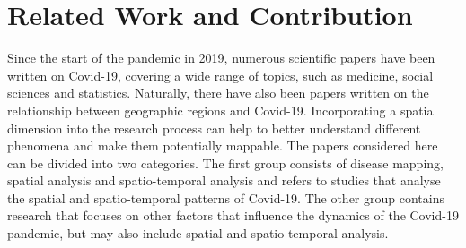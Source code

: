 \section{Related Work and Contribution}
Since the start of the pandemic in 2019, numerous scientific papers have been written on Covid-19, covering a wide range of topics, such as medicine, social sciences and statistics. Naturally, there have also been papers written on the relationship between geographic regions and Covid-19. Incorporating a spatial dimension into the research process can help to better understand different phenomena and make them potentially mappable. The papers considered here can be divided into two categories. The first group consists of disease mapping, spatial analysis and spatio-temporal analysis and refers to studies that analyse the spatial and spatio-temporal patterns of Covid-19. The other group contains research that focuses on other factors that influence the dynamics of the Covid-19 pandemic, but may also include spatial and spatio-temporal analysis.
